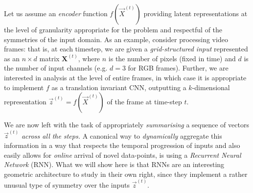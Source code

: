 Let us assume an \emph{encoder} function $f(\vec{X}^{(t)})$ providing latent representations at the level of granularity appropriate for the problem and respectful of the symmetries of the input domain. 
%
As an example, consider  processing video frames: that is, at each timestep, we are given a \emph{grid-structured input} represented as an $n\times d$ matrix $\mathbf{X}^{(t)}$, where $n$ is the number of pixels (fixed in time) and $d$ is the number of input channels (e.g. $d=3$ for RGB frames). %
Further, we are interested in analysis at the level of entire frames, in which case it is appropriate to implement $f$ as a translation invariant CNN, outputting a $k$-dimensional representation $\vec{z}^{(t)} = f(\vec{X}^{(t)})$ of the frame at time-step $t$. %

We are now left with the task of appropriately \emph{summarising} a sequence of vectors $\vec{z}^{(t)}$ {\em across all the steps.} A canonical way to \emph{dynamically} aggregate this information in a way that respects the temporal progression of inputs and also easily allows for \emph{online} arrival of novel data-points, is using a \emph{Recurrent Neural Network} (RNN). 
%
%
What we will show here is that RNNs are 
an interesting geometric architecture to study in their own right, since they implement a rather unusual type of symmetry  over the inputs $\vec{z}^{(t)}$. 

